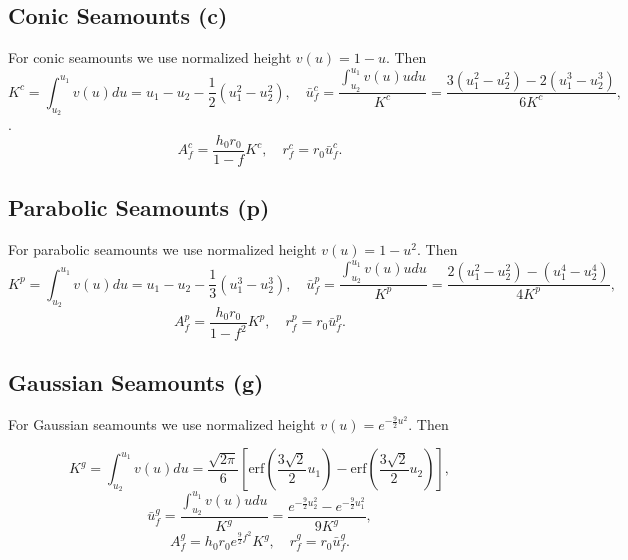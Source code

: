 \documentclass[12pt,letterpaper,margin=0.5in]{report}
\begin{document}
\subsection{Conic Seamounts (c)}

For conic seamounts we use normalized height $v(u) = 1 - u$. Then
\begin{equation}
K^c = \int_{u_2}^{u_1} v(u) du = u_1 - u_2 - \frac{1}{2}\left ( u_1^2 - u_2^2 \right ), \quad \bar{u}_f^c = \frac{\int_{u_2}^{u_1} v(u) u du}{K^c} = \frac{3(u_1^2 - u_2^2) - 2 (u_1^3 - u_2^3)}{6K^c},
\end{equation}.
\begin{equation}
A_f^c = \frac{h_0 r_0}{1-f}K^c, \quad r_f^c = r_0\bar{u}_f^c.
\end{equation}

\subsection{Parabolic Seamounts (p)}

For parabolic seamounts we use normalized height $v(u) = 1 - u^2$. Then
\begin{equation}
K^p = \int_{u_2}^{u_1} v(u) du = u_1 - u_2 - \frac{1}{3}\left ( u_1^3 - u_2^3 \right ), \quad \bar{u}_f^p = \frac{\int_{u_2}^{u_1} v(u) u du}{K^p} = \frac{2(u_1^2 - u_2^2) - (u_1^4 - u_2^4)}{4K^p},
\end{equation}
\begin{equation}
A_f^p = \frac{h_0 r_0}{1-f^2}K^p, \quad r_f^p = r_0\bar{u}_f^p.
\end{equation}

\subsection{Gaussian Seamounts (g)}

For Gaussian seamounts we use normalized height $v(u) = e^{-\frac{9}{2}u^2}$. Then

\begin{equation}
K^g = \int_{u_2}^{u_1} v(u) du = \frac{\sqrt{2\pi}}{6} \left [ \mbox{erf} \left (\frac{3\sqrt{2}}{2}u_1\right ) - \mbox{erf} \left (\frac{3\sqrt{2}}{2}u_2\right ) \right ],
\end{equation}
\begin{equation}
\bar{u}_f^g = \frac{\int_{u_2}^{u_1} v(u) u du}{K^g} = \frac{e^{-\frac{9}{2}u_2^2} - e^{-\frac{9}{2}u_1^2}}{9K^g},
\end{equation}
\begin{equation}
A_f^g = h_0 r_0 e^{\frac{9}{2}f^2} K^g, \quad r_f^g = r_0\bar{u}_f^g.
\end{equation}
\end{document}
